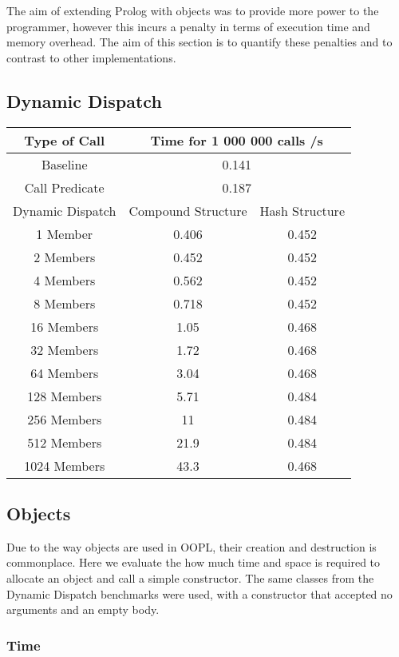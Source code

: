 \documentclass[12pt,a4paper,twoside,openright]{report}
\begin{document}
The aim of extending Prolog with objects was to provide more power to the programmer, however this incurs a penalty in terms of execution time and memory overhead. The aim of this section is to quantify these penalties and to contrast to other implementations.

\subsection{Dynamic Dispatch}

\begin{center}
\begin{tabular}{c|c|c}
Type of Call & \multicolumn{2}{c}{Time for 1 000 000 calls /s} \\
\hline
Baseline&\multicolumn{2}{c}{0.141}\\
Call Predicate&\multicolumn{2}{c}{0.187}\\
\hline
Dynamic Dispatch&Compound Structure & Hash Structure \\
\hline
1 Member&0.406	&0.452\\
2 Members&0.452&0.452\\
4 Members&0.562&0.452\\
8 Members&0.718&0.452\\
16 Members&1.05&0.468\\
32 Members&1.72&0.468\\
64 Members&3.04&0.468\\
128 Members&5.71&0.484\\
256 Members&11&0.484\\
512 Members&21.9&0.484\\
1024 Members&43.3&0.468\\
\end{tabular}
\end{center}

\subsection{Objects}

Due to the way objects are used in OOPL, their creation and destruction is commonplace. Here we evaluate the how much time and space is required to allocate an object and call a simple constructor. The same classes from the Dynamic Dispatch benchmarks were used, with a constructor that accepted no arguments and an empty body.

\subsubsection{Time}
\end{document}
